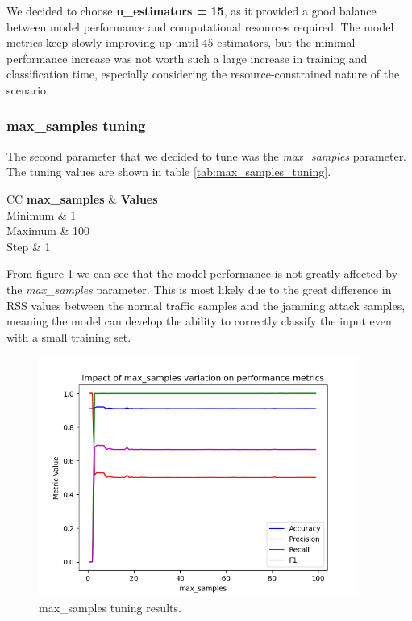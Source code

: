 \documentclass[futureinternet,article,submit,pdftex,moreauthors]{Definitions/mdpi}
\begin{document}
We decided to choose \textbf{n\_estimators = 15}, as it provided a good balance between model performance and computational resources required.
The model metrics keep slowly improving up until $45$ estimators, but the minimal performance increase was not worth such a large increase in training and classification time, especially considering the resource-constrained nature of the scenario. 

\subsubsection{max\_samples tuning}

The second parameter that we decided to tune was the \textit{max\_samples} parameter. The tuning values are shown in table \ref{tab:max_samples_tuning}.

\begin{table}[H]
	\caption{max\_samples tuning values.}\label{tab:max_samples_tuning}
	\begin{tabularx}{\textwidth}{CC}
	\toprule
	\textbf{max\_samples} & \textbf{Values} \\
	\midrule
	Minimum & 1 \\
	Maximum & 100 \\
	Step & 1 \\
	\bottomrule
\end{tabularx}
\end{table}

From figure \ref{fig:max_samples_tuning} we can see that the model performance is not greatly affected by the \textit{max\_samples} parameter. This is most likely due to the great difference in RSS values between the normal traffic samples and the jamming attack samples, meaning the model can develop the ability to correctly classify the input even with a small training set.

\begin{figure}[H]
	\includegraphics[width=10.5cm]{img/maxSamplesTuning.png}
	\caption{max\_samples tuning results.}\label{fig:max_samples_tuning}
\end{figure}
\unskip
\end{document}
